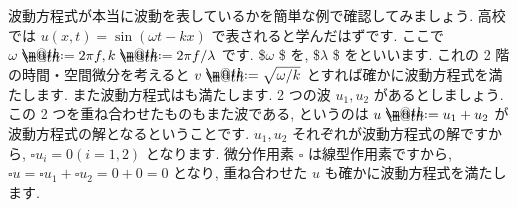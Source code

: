 \documentclass[openany, a4paper, oneside]{book}
\makeatletter
\newcommand*{\defeq}{\mathrel{\rlap{%
\raisebox{0.3ex}{$\m@th\cdot$}}%
\raisebox{-0.3ex}{$\m@th\cdot$}}%
=}
\theoremstyle{break}
\theoremstyle{breakdefn}
\makeatother
\begin{document}
波動方程式が本当に波動を表しているかを簡単な例で確認してみましょう.
高校では $u (x,t) = \sin (\omega t - k x)$ で表されると学んだはずです.
ここで $\omega \defeq 2 \pi f , k \defeq 2 \pi f/\lambda$ です.
\$$\omega$ \$ を,
\$$\lambda$ \$ をといいます.
これの 2 階の時間・空間微分を考えると $v\defeq\sqrt{\omega  /k}$ とすれば確かに波動方程式を満たします.
また波動方程式はも満たします.
2 つの波 $u_1,u_2$ があるとしましょう. この 2 つを重ね合わせたものもまた波である, というのは $u \defeq u_1 + u_2$ が
波動方程式の解となるということです.  $u_1,u_2$ それぞれが波動方程式の解ですから,
$\square u_i = 0 ( i=1,2 )$ となります.
微分作用素 $\square$ は線型作用素ですから,  $\square u = \square u_1 + \square u_2 = 0 + 0 = 0$ となり,
重ね合わせた $u$ も確かに波動方程式を満たします.
\end{document}

